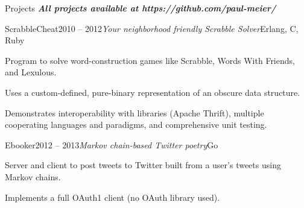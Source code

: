 \documentclass{resume} %
\begin{document}
\begin{rSection}{Projects}
\noindent{}\textbf{\textit{All projects available at https://github.com/paul-meier/}}

\begin{rSubsection}{ScrabbleCheat}{2010 -- 2012}{\textit{Your neighborhood friendly Scrabble Solver}}{Erlang, C, Ruby}
\item Program to solve word-construction games like Scrabble, Words With Friends, and Lexulous.
\item Uses a custom-defined, pure-binary representation of an obscure data structure.
\item Demonstrates interoperability with libraries (Apache Thrift), multiple
    cooperating languages and paradigms, and comprehensive unit testing.
\end{rSubsection}

\begin{rSubsection}{Ebooker}{2012 -- 2013}{\textit{Markov chain-based Twitter poetry}}{Go}
\item Server and client to post tweets to Twitter built from a user's tweets using Markov chains.
\item Implements a full OAuth1 client (no OAuth library used).
\end{rSubsection}
\end{rSection}

\end{document}
